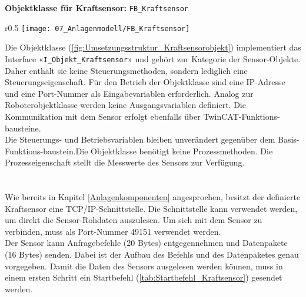 		\textbf{Objektklasse für Kraftsensor:} \verb|FB_Kraftsensor|
		\vspace{2mm}
		\vspace{-10mm}  
		\\
		\begin{wrapfigure}{r}{0.5\textwidth}
			\centering
			\texttt{[image: 07\_Anlagenmodell/FB\_Kraftsensor]}
			\captionsetup{justification=centering}
			\caption{Umsetzungsstruktur von Kraftsensor-Objekt}
			\label{fig:Umsetzungsstruktur_Kraftsensorobjekt}
		\end{wrapfigure} \par
		Die Objektklasse (\ref{fig:Umsetzungsstruktur_Kraftsensorobjekt}) implementiert das Interface «\verb|I_Objekt_Kraftsensor|» und gehört zur Kategorie der Sensor-Objekte. Daher enthält sie keine Steuerungsmethoden, sondern lediglich eine Steuerungseigenschaft. Für den Betrieb der Objektklasse sind eine IP-Adresse und eine Port-Nummer als Eingabevariablen erforderlich. Analog zur Roboterobjektklasse werden keine Ausgangsvariablen definiert. Die Kommunikation mit dem Sensor erfolgt ebenfalls über TwinCAT-Funktions-bausteine.
		\\
		Die Steuerungs- und Betriebsvariablen bleiben unverändert gegenüber dem Basis-Funktions-baustein.Die Objektklasse benötigt keine Prozessmethoden. Die Prozesseigenschaft stellt die Messwerte des Sensors zur Verfügung. 
		\\
		\\
		\\
		Wie bereits in Kapitel \ref{Anlagenkomponenten} angesprochen, besitzt der definierte Kraftsensor eine TCP/IP-Schnittstelle. Die Schnittstelle kann verwendet werden, um direkt die Sensor-Rohdaten auszulesen. Um sich mit dem Sensor zu verbinden, muss als Port-Nummer 49151 verwendet werden. 
		\\
		Der Sensor kann Anfragebefehle (20 Bytes) entgegennehmen und Datenpakete (16 Bytes) senden. Dabei ist der Aufbau des Befehls und des Datenpaketes genau vorgegeben. Damit die Daten des Sensors ausgelesen werden können, muss in einem ersten Schritt ein Startbefehl (\ref{tab:Startbefehl_Kraftsensor}) gesendet werden. 
		
